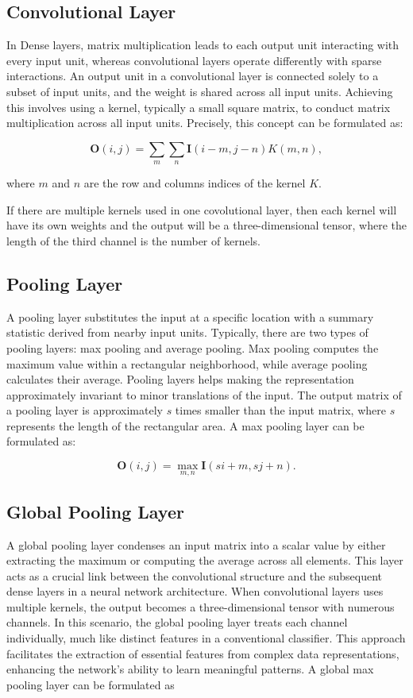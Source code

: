 \documentclass[]{interact}
\theoremstyle{plain}%
\theoremstyle{definition}
\theoremstyle{remark}
\begin{document}
\subsection{Convolutional Layer}\label{convolutional-layer}

In Dense layers, matrix multiplication leads to each output unit
interacting with every input unit, whereas convolutional layers operate
differently with sparse interactions. An output unit in a convolutional
layer is connected solely to a subset of input units, and the weight is
shared across all input units. Achieving this involves using a kernel,
typically a small square matrix, to conduct matrix multiplication across
all input units. Precisely, this concept can be formulated as:

\[\boldsymbol{O}(i, j) = \sum_m\sum_n\boldsymbol{I}(i - m, j - n)K(m, n),\]

where \(m\) and \(n\) are the row and columns indices of the kernel
\(K\).

If there are multiple kernels used in one covolutional layer, then each
kernel will have its own weights and the output will be a
three-dimensional tensor, where the length of the third channel is the
number of kernels.

\subsection{Pooling Layer}\label{pooling-layer}

A pooling layer substitutes the input at a specific location with a
summary statistic derived from nearby input units. Typically, there are
two types of pooling layers: max pooling and average pooling. Max
pooling computes the maximum value within a rectangular neighborhood,
while average pooling calculates their average. Pooling layers helps
making the representation approximately invariant to minor translations
of the input. The output matrix of a pooling layer is approximately
\(s\) times smaller than the input matrix, where \(s\) represents the
length of the rectangular area. A max pooling layer can be formulated
as:

\[\boldsymbol{O}(i, j) = \underset{m,n}{\max} \boldsymbol{I}(si + m,sj+n).\]

\subsection{Global Pooling Layer}\label{global-pooling-layer}

A global pooling layer condenses an input matrix into a scalar value by
either extracting the maximum or computing the average across all
elements. This layer acts as a crucial link between the convolutional
structure and the subsequent dense layers in a neural network
architecture. When convolutional layers uses multiple kernels, the
output becomes a three-dimensional tensor with numerous channels. In
this scenario, the global pooling layer treats each channel
individually, much like distinct features in a conventional classifier.
This approach facilitates the extraction of essential features from
complex data representations, enhancing the network's ability to learn
meaningful patterns. A global max pooling layer can be formulated as
\end{document}
